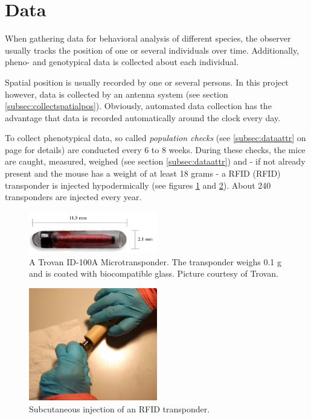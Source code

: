 \newpage
\section{Data}
\label{sec:datacollection}

When gathering data for behavioral analysis of different species, the observer usually tracks the position of one or several individuals over time. Additionally, pheno- and genotypical data is collected about each individual.

Spatial position is usually recorded by one or several persons. In this project however, data is collected by an antenna system (see section \ref{subsec:collectspatialpos}). Obviously, automated data collection has the advantage that data is recorded automatically around the clock every day.

To collect phenotypical data, so called \textit{population checks} (see \ref{subsec:dataattr} on page \pageref{subsec:dataattr} for details) are conducted every 6 to 8 weeks. During these checks, the mice are caught, measured, weighed (see section \ref{subsec:dataattr}) and - if not already present and the mouse has a weight of at least 18 grams - a \ac{RFID} (RFID) transponder is injected hypodermically (see figures \ref{fig:transponder} and \ref{fig:inject_rfid}). About 240 transponders are injected every year.

\begin{figure}[htpb]
\begin{center}
\includegraphics[width=0.5\textwidth]{assets/pdf/transponder.pdf}
  \caption[Trovan ID-100A Microtransponder]{A Trovan ID-100A Microtransponder. The transponder weighs 0.1 g and is coated with biocompatible glass. \footnotesize Picture courtesy of Trovan.}
  \label{fig:transponder}
\end{center}
\end{figure}
\begin{figure}[htpb]
\begin{center}
\includegraphics[width=0.5\textwidth]{assets/pdf/transponder_inject.pdf}
  \caption[Subcutaneous injection of an RFID transponder]{Subcutaneous injection of an RFID transponder.}
  \label{fig:inject_rfid}
\end{center}
\end{figure}

